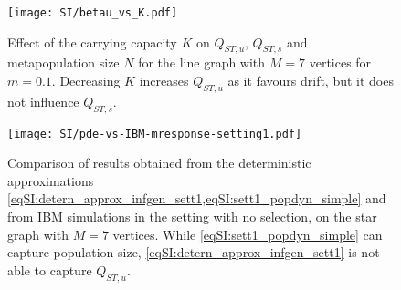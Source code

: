 \begin{figure}[t]
  \centering
    \texttt{[image: SI/betau\_vs\_K.pdf]}
    \caption{Effect of the carrying capacity $K$ on $Q_{ST,u}$, $Q_{ST,s}$ and metapopulation size $N$ for the line graph with $M=7$ vertices for $m=0.1$. Decreasing $K$ increases $Q_{ST,u}$ as it favours drift, but it does not influence $Q_{ST,s}$.}\label{figSI:betau_vs_K}
\end{figure}

\FloatBarrier





\begin{figure}[t]
  \centering
    \texttt{[image: SI/pde-vs-IBM-mresponse-setting1.pdf]} 
    \caption{ Comparison of results obtained from the deterministic approximations \cref{eqSI:detern_approx_infgen_sett1,eqSI:sett1_popdyn_simple} and from IBM simulations in the setting with no selection, on the star graph with $M=7$ vertices. While \cref{eqSI:sett1_popdyn_simple} can capture population size, \cref{eqSI:detern_approx_infgen_sett1} is not able to capture $Q_{ST,u}$.
    }
    \label{figSI:pde-vs-IBM-mresponse-setting1}
\end{figure}


